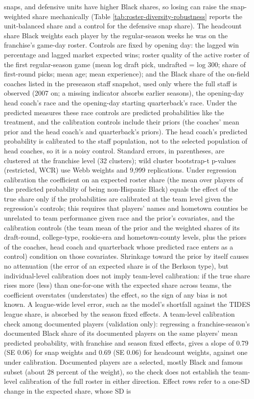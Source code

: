 \begin{table}[!h]
{\begin{threeparttable}
\begin{tablenotes}[para]
snaps, and defensive units have higher Black shares, so losing can raise the snap-weighted share mechanically (Table \ref{tab:roster-diversity-robustness} reports the unit-balanced share and a control for the defensive snap share). The headcount share Black weights each player by the regular-season weeks he was on the franchise's game-day roster. Controls are fixed by opening day: the lagged win percentage and lagged market expected wins; roster quality of the active roster of the first regular-season game (mean log draft pick, undrafted = log 300; share of first-round picks; mean age; mean experience); and the Black share of the on-field coaches listed in the preseason staff snapshot, used only where the full staff is observed (2007 on; a missing indicator absorbs earlier seasons), the opening-day head coach's race and the opening-day starting quarterback's race. Under the predicted measures these race controls are predicted probabilities like the treatment, and the calibration controls include their priors (the coaches' mean prior and the head coach's and quarterback's priors). The head coach's predicted probability is calibrated to the staff population, not to the selected population of head coaches, so it is a noisy control. Standard errors, in parentheses, are clustered at the franchise level (32 clusters); wild cluster bootstrap-t p-values (restricted, WCR) use Webb weights and 9,999 replications. Under regression calibration the coefficient on an expected roster share (the mean over players of the predicted probability of being non-Hispanic Black) equals the effect of the true share only if the probabilities are calibrated at the team level given the regression's controls; this requires that players' names and hometown counties be unrelated to team performance given race and the prior's covariates, and the calibration controls (the team mean of the prior and the weighted shares of its draft-round, college-type, rookie-era and hometown-county levels, plus the priors of the coaches, head coach and quarterback whose predicted race enters as a control) condition on those covariates. Shrinkage toward the prior by itself causes no attenuation (the error of an expected share is of the Berkson type), but individual-level calibration does not imply team-level calibration: if the true share rises more (less) than one-for-one with the expected share across teams, the coefficient overstates (understates) the effect, so the sign of any bias is not known. A league-wide level error, such as the model's shortfall against the TIDES league share, is absorbed by the season fixed effects. A team-level calibration check among documented players (validation only): regressing a franchise-season's documented Black share of its documented players on the same players' mean predicted probability, with franchise and season fixed effects, gives a slope of 0.79 (SE 0.06) for snap weights and  0.69 (SE 0.06) for headcount weights, against one under calibration. Documented players are a selected, mostly Black and famous subset (about 28 percent of the weight), so the check does not establish the team-level calibration of the full roster in either direction. Effect rows refer to a one-SD change in the expected share, whose SD is 
\end{tablenotes}
\end{threeparttable}}
\end{table}

